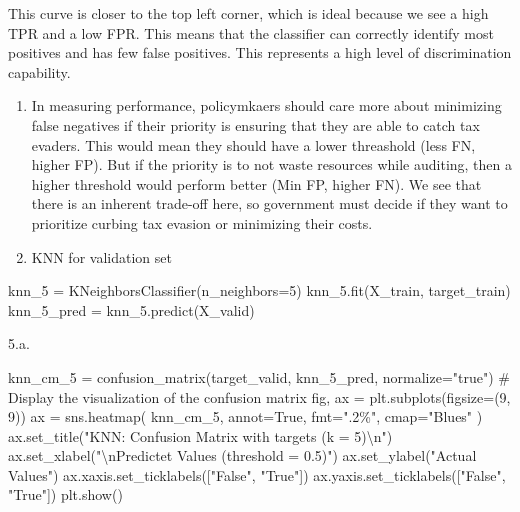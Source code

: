 \documentclass[
  11pt,
  letterpaper,
  DIV=11,
  numbers=noendperiod]{scrartcl}
\newenvironment{Shaded}{\begin{snugshade}}{\end{snugshade}}
\newcommand{\CharTok}[1]{\textcolor[rgb]{0.13,0.47,0.30}{#1}}
\newcommand{\CommentTok}[1]{\textcolor[rgb]{0.37,0.37,0.37}{#1}}
\newcommand{\DecValTok}[1]{\textcolor[rgb]{0.68,0.00,0.00}{#1}}
\newcommand{\NormalTok}[1]{\textcolor[rgb]{0.00,0.23,0.31}{#1}}
\newcommand{\OperatorTok}[1]{\textcolor[rgb]{0.37,0.37,0.37}{#1}}
\newcommand{\StringTok}[1]{\textcolor[rgb]{0.13,0.47,0.30}{#1}}
\newcommand{\VariableTok}[1]{\textcolor[rgb]{0.07,0.07,0.07}{#1}}
\begin{document}
This curve is closer to the top left corner, which is ideal because we
see a high TPR and a low FPR. This means that the classifier can
correctly identify most positives and has few false positives. This
represents a high level of discrimination capability.

\begin{enumerate}
\def\labelenumi{\arabic{enumi}.}
\setcounter{enumi}{3}
\item
  In measuring performance, policymkaers should care more about
  minimizing false negatives if their priority is ensuring that they are
  able to catch tax evaders. This would mean they should have a lower
  threashold (less FN, higher FP). But if the priority is to not waste
  resources while auditing, then a higher threshold would perform better
  (Min FP, higher FN). We see that there is an inherent trade-off here,
  so government must decide if they want to prioritize curbing tax
  evasion or minimizing their costs.
\item
  KNN for validation set
\end{enumerate}

\begin{Shaded}
\begin{Highlighting}[]
\NormalTok{knn\_5 }\OperatorTok{=}\NormalTok{ KNeighborsClassifier(n\_neighbors}\OperatorTok{=}\DecValTok{5}\NormalTok{)}
\NormalTok{knn\_5.fit(X\_train, target\_train)}
\NormalTok{knn\_5\_pred }\OperatorTok{=}\NormalTok{ knn\_5.predict(X\_valid)}
\end{Highlighting}
\end{Shaded}

5.a.

\begin{Shaded}
\begin{Highlighting}[]
\NormalTok{knn\_cm\_5 }\OperatorTok{=}\NormalTok{ confusion\_matrix(target\_valid, knn\_5\_pred, normalize}\OperatorTok{=}\StringTok{"true"}\NormalTok{)}
\CommentTok{\# Display the visualization of the confusion matrix}
\NormalTok{fig, ax }\OperatorTok{=}\NormalTok{ plt.subplots(figsize}\OperatorTok{=}\NormalTok{(}\DecValTok{9}\NormalTok{, }\DecValTok{9}\NormalTok{))}
\NormalTok{ax }\OperatorTok{=}\NormalTok{ sns.heatmap(}
\NormalTok{knn\_cm\_5, annot}\OperatorTok{=}\VariableTok{True}\NormalTok{, fmt}\OperatorTok{=}\StringTok{".2\%"}\NormalTok{, cmap}\OperatorTok{=}\StringTok{"Blues"}
\NormalTok{)}
\NormalTok{ax.set\_title(}\StringTok{"KNN: Confusion Matrix with targets (k = 5)}\CharTok{\textbackslash{}n}\StringTok{"}\NormalTok{)}
\NormalTok{ax.set\_xlabel(}\StringTok{"}\CharTok{\textbackslash{}n}\StringTok{Predictet Values (threshold = 0.5)"}\NormalTok{)}
\NormalTok{ax.set\_ylabel(}\StringTok{"Actual Values"}\NormalTok{)}
\NormalTok{ax.xaxis.set\_ticklabels([}\StringTok{"False"}\NormalTok{, }\StringTok{"True"}\NormalTok{])}
\NormalTok{ax.yaxis.set\_ticklabels([}\StringTok{"False"}\NormalTok{, }\StringTok{"True"}\NormalTok{])}
\NormalTok{plt.show()}
\end{Highlighting}
\end{Shaded}
\end{document}
